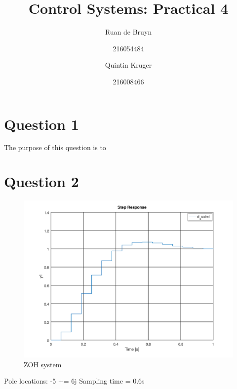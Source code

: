\documentclass[a4paper, 12pt]{article}
\title{Control Systems: Practical 4}
\author{Ruan de Bruyn \and 216054484 \and Quintin Kruger \and 216008466}
\begin{document}
\maketitle
\newpage
{}
\tableofcontents
\listoffigures
\newpage
{}

\section{Question 1} %
\label{sec:question_1}
The purpose of this question is to 


\section{Question 2}

\begin{figure}[H]
	\centering
	\includegraphics{./img/2_1.png}
	\caption{ZOH system}
	\label{fig:2_1}
\end{figure}

Pole locations: -5 += 6j
Sampling time = 0.6s

\end{document}
